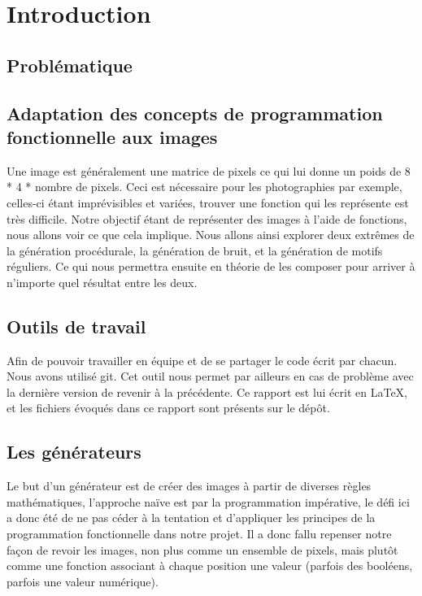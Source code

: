 \documentclass[a4paper,10pt]{article}
\begin{document}
\newpage
\tableofcontents
\newpage
\section{Introduction}


\subsection{Problématique}
\subsection{Adaptation des concepts de programmation fonctionnelle aux images}
Une image est généralement une matrice de pixels ce qui lui donne un poids de 
8 * 4 * nombre de pixels. Ceci est nécessaire pour les photographies par exemple, celles-ci étant imprévisibles et variées, trouver une fonction qui les représente est très difficile.
Notre objectif étant de représenter des images à l'aide de fonctions, nous allons voir ce que cela implique.
Nous allons ainsi explorer deux extrêmes de la génération procédurale, la génération de bruit, et la génération de motifs réguliers. Ce qui nous permettra ensuite en théorie de les composer pour arriver à n'importe quel résultat entre les deux.

\subsection{Outils de travail}

Afin de pouvoir travailler en équipe et de se partager le code  écrit par chacun. Nous avons utilisé git. Cet outil nous permet par ailleurs en cas de problème avec la dernière version de revenir à la précédente. Ce rapport est lui écrit en \LaTeX , et les fichiers évoqués dans ce rapport sont présents sur le dépôt.






\subsection{Les générateurs}
Le but d'un générateur est de créer des images à partir de diverses règles mathématiques, l'approche naïve est par la programmation impérative, le défi ici a donc été de ne pas céder à la tentation et d'appliquer les principes de la programmation fonctionnelle dans notre projet. Il a donc fallu repenser notre façon de revoir les images, non plus comme un ensemble de pixels, mais plutôt comme une fonction associant à chaque position une valeur (parfois des booléens, parfois une valeur numérique).
\end{document}
